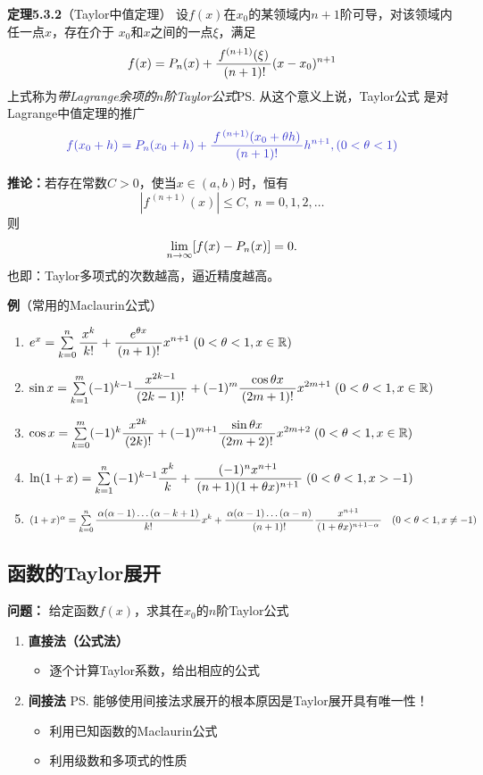 {\bf 定理5.3.2}（Taylor中值定理）
设$f(x)$在$x_0$的某领域内$n+1$阶可导，对该领域内任一点$x$，存在介于
$x_0$和$x$之间的一点$\xi$，满足
$${f(x)=P_n(x)+\displaystyle\frac{\,{f^{(n+1)}(\xi)}\,}{\,{\,(n+1)!}\,}(x-x_0)^{n+1}}$$
上式称为{\it 带Lagrange余项的$n$阶Taylor公式}\ps{从这个意义上说，Taylor公式
是对Lagrange中值定理的推广}
$${\b f(x_0+h)=P_n(x_0+h)+\df{f^{\,(n+1)}(x_0+\theta
h)}{(n+1)!}h^{n+1},(0<\theta<1)}$$

{\bf 推论：}若存在常数$C>0$，使当$x\in(a,b)$时，恒有
$$|f^{\,(n+1)}(x)|\leq C,\;n=0,1,2,\ldots$$
则
$$\lim\limits_{n\to\infty} [f(x)-P_n(x)]=0.$$
也即：Taylor多项式的次数越高，逼近精度越高。

{\b
{\bf 例}（常用的Maclaurin公式）
\begin{enumerate}[(1)]
  \setlength{\itemindent}{1cm}
  \item {$e^x =\sum\limits_{k=0}^n\displaystyle\frac{\,{x^k}\,}{\,{k!}\,}
  +\displaystyle\frac{\,{e^{\theta x}}\,}{\,{(n+1)!}\,}x^{n+1}\;
  (0<\theta<1,x\in\mathbb{R})$}
  \item {$\sin x
  =\sum\limits_{k=1}^m(-1)^{k-1}\displaystyle\frac{\,{x^{2k-1}}\,}{\,{(2k-1)!}\,} 
  +(-1)^m\displaystyle\frac{\,{\cos\theta x}\,}{\,{(2m+1)!}\,}x^{2m+1}\;
  (0<\theta<1,x\in\mathbb{R})$}
  \item {$\cos x= \sum\limits_{k=0}^m(-1)^{k}\displaystyle\frac{\,{x^{2k}}\,}{\,{(2k)!}\,}
  +(-1)^{m+1}\displaystyle\frac{\,{\sin\theta
  x}\,}{\,{(2m+2)!}\,}x^{2m+2}\; (0<\theta<1,x\in\mathbb{R})$}
  \item
  {$\ln(1+x) =\sum\limits_{k=1}^n(-1)^{k-1}\displaystyle\frac{\,{x^k}\,}{\,{k}\,}
  +\displaystyle\frac{\,{(-1)^nx^{n+1}}\,}{\,{(n+1)(1+\theta
  x)^{n+1}}\,}\; (0<\theta<1,x>-1)$} 
  \item
  {$(1+x)^\alpha =\sum\limits_{k=0}^n
  \displaystyle\frac{\,{\alpha(\alpha-1)\ldots(\alpha-k+1)}\,}{\,{k!}\,}x^k
	 +\displaystyle\frac{\,{\alpha(\alpha-1)\ldots(\alpha-n)}\,}{\,{(n+1)!}\,}\displaystyle\frac{\,{x^{n+1}}\,}{\,{(1+\theta
	x)^{n+1-\alpha}}\,}\quad (0<\theta<1,x\ne -1)$}
\end{enumerate}
}

\subsection{函数的Taylor展开}

{\bf 问题：}{ 给定函数$f(x)$，求其在$x_0$的$n$阶Taylor公式} 
\begin{enumerate}[(1)]
  \setlength{\itemindent}{1cm}
  \item {\bf 直接法（公式法）} 
  \begin{itemize}
    \item 逐个计算Taylor系数，给出相应的公式 
  \end{itemize}
  \item {\bf 间接法} \ps{能够使用间接法求展开的根本原因是Taylor展开具有唯一性！}
  \begin{itemize}
    \item 利用已知函数的Maclaurin公式 
    \item 利用级数和多项式的性质
  \end{itemize}
\end{enumerate}

